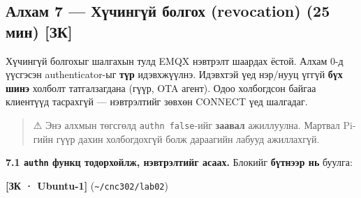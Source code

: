 \hypertarget{ux430ux43bux445ux430ux43c-7-ux445ux4afux447ux438ux43dux433ux4afux439-ux431ux43eux43bux433ux43eux445-revocation-25-ux43cux438ux43d-ux437ux43a}{%
\subsection{Алхам 7 --- Хүчингүй болгох (revocation) (25 мин) {[}ЗК{]}}\label{ux430ux43bux445ux430ux43c-7-ux445ux4afux447ux438ux43dux433ux4afux439-ux431ux43eux43bux433ux43eux445-revocation-25-ux43cux438ux43d-ux437ux43a}}

Хүчингүй болгохыг шалгахын тулд EMQX нэвтрэлт шаардах ёстой. Алхам 0-д үүсгэсэн authenticator-ыг \textbf{түр} идэвхжүүлнэ. Идэвхтэй үед нэр/нууц үггүй \textbf{бүх шинэ} холболт татгалзагдана (гүүр, OTA агент). Одоо холбогдсон байгаа клиентүүд тасрахгүй --- нэвтрэлтийг зөвхөн CONNECT үед шалгадаг.

\begin{quote}
⚠ Энэ алхмын төгсгөлд \texttt{authn\ false}-ийг \textbf{заавал} ажиллуулна. Мартвал Pi-гийн гүүр дахин холбогдохгүй болж дараагийн лабууд ажиллахгүй.
\end{quote}

\textbf{7.1 \texttt{authn} функц тодорхойлж, нэвтрэлтийг асаах.} Блокийг \textbf{бүтнээр нь} буулга:

\textbf{{[}ЗК · Ubuntu-1{]}} (\texttt{\textasciitilde{}/cnc302/lab02})


